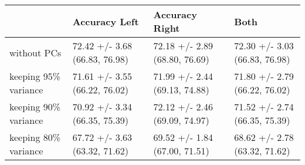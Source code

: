 \begin{tabular}{llll}
\toprule
{} &                  Accuracy Left &                 Accuracy Right &                           Both \\
\midrule
without PCs          &  72.42 +/- 3.68 (66.83, 76.98) &  72.18 +/- 2.89 (68.80, 76.69) &  72.30 +/- 3.03 (66.83, 76.98) \\
keeping 95\% variance &  71.61 +/- 3.55 (66.22, 76.02) &  71.99 +/- 2.44 (69.13, 74.88) &  71.80 +/- 2.79 (66.22, 76.02) \\
keeping 90\% variance &  70.92 +/- 3.34 (66.35, 75.39) &  72.12 +/- 2.46 (69.09, 74.97) &  71.52 +/- 2.74 (66.35, 75.39) \\
keeping 80\% variance &  67.72 +/- 3.63 (63.32, 71.62) &  69.52 +/- 1.84 (67.00, 71.51) &  68.62 +/- 2.78 (63.32, 71.62) \\
\bottomrule
\end{tabular}
